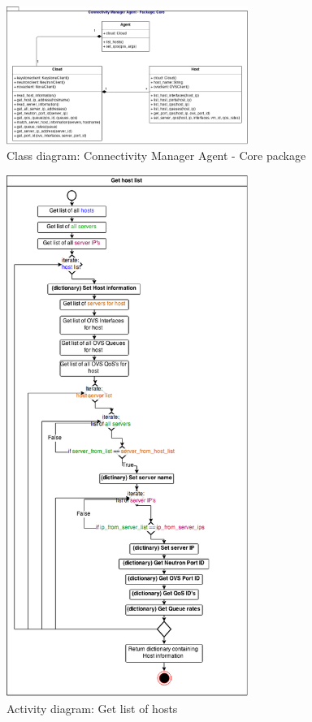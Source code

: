 \begin{figure}[H]
\centering

\includegraphics[width=0.7\textwidth]{images/design/cm_agent_class_diagram}

\caption{Class diagram: Connectivity Manager Agent - Core package}
\end{figure}


\begin{figure}[H]
\centering

\includegraphics[width=0.7\textwidth]{images/design/activity_host_list}

\caption{Activity diagram: Get list of hosts}
\end{figure}

